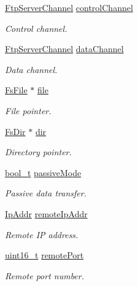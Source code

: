 \begin{DoxyCompactItemize}
\hyperlink{structFtpServerChannel}{Ftp\+Server\+Channel} \hyperlink{struct__FtpClientConnection_a29ae5684371cbb12a4ed5a179cf9ab92}{control\+Channel}
\begin{DoxyCompactList}\small\item\em Control channel. \end{DoxyCompactList}\item 
\hyperlink{structFtpServerChannel}{Ftp\+Server\+Channel} \hyperlink{struct__FtpClientConnection_a6f6689abb4e803f4014d41b80617c6df}{data\+Channel}
\begin{DoxyCompactList}\small\item\em Data channel. \end{DoxyCompactList}\item 
\hyperlink{fs__port__fatfs_8h_a913e2a93cbf8ed241fe05fb6abc3f316}{Fs\+File} $\ast$ \hyperlink{struct__FtpClientConnection_afa1056ae0607ea6f5db9fb377b671566}{file}
\begin{DoxyCompactList}\small\item\em File pointer. \end{DoxyCompactList}\item 
\hyperlink{structFsDir}{Fs\+Dir} $\ast$ \hyperlink{struct__FtpClientConnection_a5e2e292f7a5a4395b9831d0f0edc171d}{dir}
\begin{DoxyCompactList}\small\item\em Directory pointer. \end{DoxyCompactList}\item 
\hyperlink{compiler__port_8h_a812d16e5494522586b3784e55d479912}{bool\+\_\+t} \hyperlink{struct__FtpClientConnection_a263b55cadbb1fc7edaf7e5ae63a0cf44}{passive\+Mode}
\begin{DoxyCompactList}\small\item\em Passive data transfer. \end{DoxyCompactList}\item 
\hyperlink{structIpAddr}{Ip\+Addr} \hyperlink{struct__FtpClientConnection_a76381be2a3bff01d89c4cdabc2cdafd8}{remote\+Ip\+Addr}
\begin{DoxyCompactList}\small\item\em Remote IP address. \end{DoxyCompactList}\item 
\hyperlink{stdint_8h_a273cf69d639a59973b6019625df33e30}{uint16\+\_\+t} \hyperlink{struct__FtpClientConnection_ad1173df8d2ab79484f1ce16c868e1f3d}{remote\+Port}
\begin{DoxyCompactList}\small\item\em Remote port number. \end{DoxyCompactList}\item 

\end{DoxyCompactItemize}
